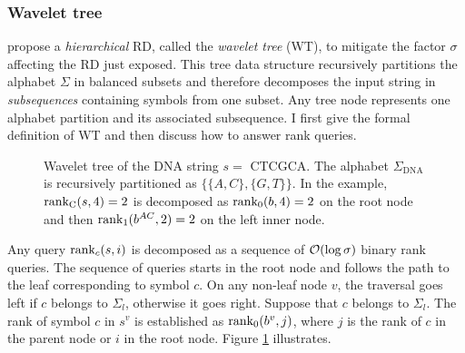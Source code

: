 \subsubsection{Wavelet tree}

\citeauthor{Grossi2003} propose a \emph{hierarchical} RD, called the \emph{wavelet tree} (WT), to mitigate the factor $\sigma$ affecting the RD just exposed.
This tree data structure recursively partitions the alphabet $\Sigma$ in balanced subsets and therefore decomposes the input string in \emph{subsequences} containing symbols from one subset.
Any tree node represents one alphabet partition and its associated subsequence.
I first give the formal definition of WT and then discuss how to answer rank queries.


\begin{figure}[b]
\begin{center}
\caption[Example of wavelet tree]{Wavelet tree of the DNA string $s=$ {\ttfamily CTCGCA}. The alphabet $\Sigma_{\text{DNA}}$ is recursively partitioned as $\{ \{A,C\}, \{G,T\} \}$. In the example, $\text{rank}_{\text{C}}(s,4)=2$ is decomposed as $\text{rank}_0(b,4) = 2$ on the root node and then $\text{rank}_1(b^{AC}, 2) = 2$ on the left inner node.}
\label{fig:wt_dna}
\ttfamily

\end{center}
\end{figure}

Any query $\text{rank}_c(s,i)$ is decomposed as a sequence of $\mathcal{O}(\log{\sigma})$ binary rank queries.
The sequence of queries starts in the root node and follows the path to the leaf corresponding to symbol $c$.
On any non-leaf node $v$, the traversal goes left if $c$ belongs to $\Sigma_l$, otherwise it goes right.
Suppose \wlogs that $c$ belongs to $\Sigma_l$.
The rank of symbol $c$ in $s^v$ is established as $\text{rank}_0(b^v, j)$, where $j$ is the rank of $c$ in the parent node or $i$ in the root node.
Figure \ref{fig:wt_dna} illustrates.

